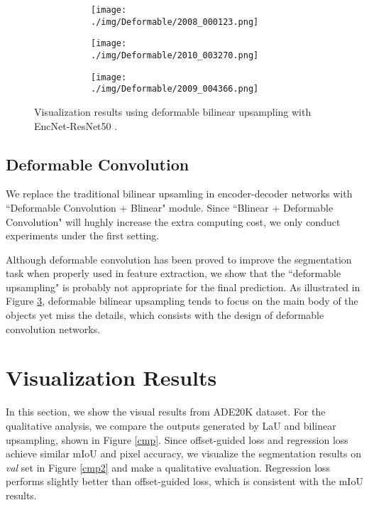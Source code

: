 \documentclass[10pt,twocolumn,letterpaper]{article}
\begin{document}
\begin{figure}[t]
\begin{subfigure}[t]{0.15\textwidth}
        \begin{subfigure}[t]{\textwidth}
                \texttt{[image: ./img/Deformable/2008\_000123.png]}
            \end{subfigure}\vspace{.1ex}

        \begin{subfigure}[t]{\textwidth}
                \texttt{[image: ./img/Deformable/2010\_003270.png]}
            \end{subfigure}\vspace{.1ex}

            \begin{subfigure}[t]{\textwidth}
                \texttt{[image: ./img/Deformable/2009\_004366.png]}
 \captionsetup{justification=centering}            
        \label{e}
            \end{subfigure}
    \end{subfigure}
\caption{Visualization results using deformable bilinear upsampling with EncNet-ResNet50 \cite{EncNet}.}
\label{deformable}
\end{figure}

\subsection{Deformable Convolution}
We replace the traditional bilinear upsamling in encoder-decoder networks with ``Deformable  Convolution \cite{DaiQXLZHW17} + Blinear" module. Since ``Blinear + Deformable  Convolution" will hughly increase the extra computing cost, we only conduct experiments under the first setting.

Although deformable convolution has been proved to improve the segmentation task when properly used in feature extraction, we show that the ``deformable upsampling" is probably not appropriate for the final prediction. As illustrated in Figure \ref{deformable}, deformable bilinear upsampling tends to focus on the main body of the objects yet miss the details, which consists with the design  of deformable convolution networks.

\section{Visualization Results}
In this section, we show the visual results from ADE20K dataset. For the qualitative analysis, we compare the outputs generated by LaU and bilinear upsampling, shown in Figure \ref{cmp}. Since offset-guided loss and regression loss achieve similar mIoU and pixel accuracy, we visualize the segmentation results on \textit{val} set in Figure \ref{cmp2} and make a qualitative evaluation. Regression loss performs slightly better than offset-guided loss, which is consistent with the mIoU results.
\end{document}
